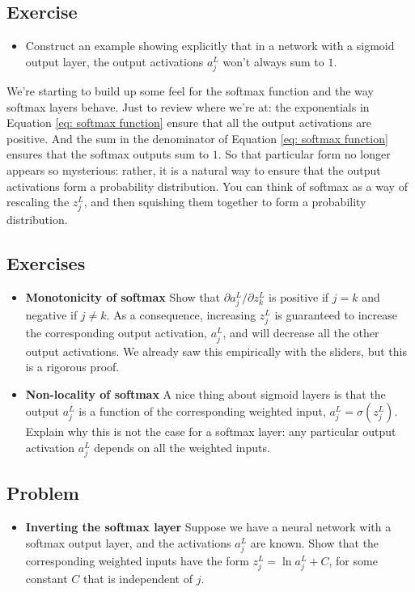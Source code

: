 \documentclass[a4paper,11pt,twoside]{report}
\begin{document}
\subsection*{Exercise}
\label{Exercise: sigmoid activations on output do not sum up to 1}
\begin{itemize}
\item Construct an example showing explicitly that in a network with a sigmoid output layer, the output activations $a^L_j$ won't always sum to $1$.
\end{itemize}

We're starting to build up some feel for the softmax function and the way softmax layers behave. Just to review where we're at: the exponentials in Equation \ref{eq: softmax function} ensure that all the output activations are positive. And the sum in the denominator of Equation \ref{eq: softmax function} ensures that the softmax outputs sum to $1$. So that particular form no longer appears so mysterious: rather, it is a natural way to ensure that the output activations form a probability distribution. You can think of softmax as a way of rescaling the $z^L_j$, and then squishing them together to form a probability distribution.

\subsection*{Exercises}
\label{Exercises: softmax properties}
\begin{itemize}
\item \textbf{Monotonicity of softmax}
Show that $\partial a^L_j/\partial z^L_k$ is positive if $j=k$ and negative if $j\ne k$. As a consequence, increasing $z^L_j$ is guaranteed to increase the corresponding output activation, $a^L_j$, and will decrease all the other output activations. We already saw this empirically with the sliders, but this is a rigorous proof.
\item \textbf{Non-locality of softmax}
A nice thing about sigmoid layers is that the output $a^L_j$ is a function of the corresponding weighted input, $a^L_j=\sigma(z^L_j)$. Explain why this is not the case for a softmax layer: any particular output activation $a^L_j$ depends on all the weighted inputs.
\end{itemize}

\subsection*{Problem}
\label{Problem: softmax layer}
\begin{itemize}
\item \textbf{Inverting the softmax layer}
Suppose we have a neural network with a softmax output layer, and the activations $a^L_j$ are known. Show that the corresponding weighted inputs have the form $z^L_j=\ln a^L_j+C$, for some constant $C$ that is independent of $j$.
\end{itemize}
\end{document}
